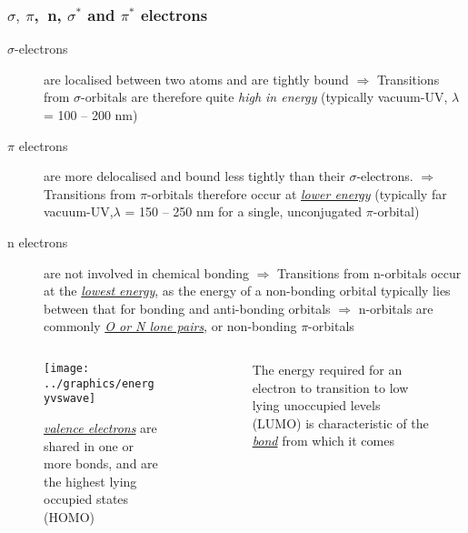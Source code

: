 \documentclass[ignorenonframetext]{beamer}
\begin{document}
\begin{frame}
\frametitle{\(\sigma,\  \pi\),\ n, \(\sigma^*\) and \(\pi^*\) electrons}
\begin{description}
\item[\(\sigma\)-electrons] are localised between two atoms and are tightly bound\newline 
\(\Rightarrow\) Transitions from \(\sigma\)-orbitals are therefore quite \emph{high in energy} (typically vacuum-UV, \(\lambda\) = 100 -- 200 nm)
\item[\(\pi\) electrons] are more delocalised and bound less tightly than their \(\sigma\)-electrons.\newline
\(\Rightarrow\) Transitions from \(\pi\)-orbitals therefore occur at \emph{\underline{lower energy}} (typically far vacuum-UV,\(\lambda\) = 150 -- 250 nm for a single, unconjugated \(\pi\)-orbital)
\item[n electrons] are not involved in chemical bonding\newline
\(\Rightarrow\) Transitions from n-orbitals occur at the \emph{\underline{lowest energy}}, as the energy of a non-bonding orbital typically lies between that for bonding and anti-bonding orbitals
\(\Rightarrow\) n-orbitals are commonly \emph{\underline{O or N lone pairs}}, or non-bonding \(\pi\)-orbitals
\end{description}
\end{frame}

\begin{frame}
\begin{columns}[onlytextwidth]
\begin{column}{.5\textwidth}
\begin{figure}
\caption{\emph{\underline{valence electrons}} are shared in one or more bonds, and are the highest lying occupied states (HOMO)}
\texttt{[image: ../graphics/energyvswave]} 
\end{figure} 
\end{column}
\begin{column}{.5\textwidth}
\begin{figure}
\caption{The energy required for an electron to transition to low lying unoccupied levels (LUMO) is characteristic of the \emph{\underline{bond}} from which it comes} 
\end{figure}
\end{column}
\end{columns}
\end{frame}
\end{document}
